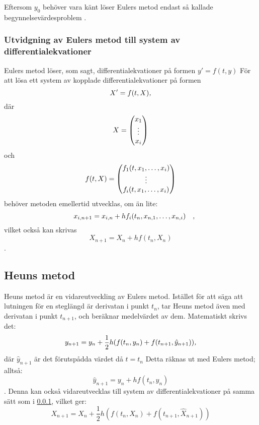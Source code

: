 Eftersom \(y_0\) behöver vara känt löser Eulers metod endast så kallade begynnelsevärdes\-problem \parencite[310]{suli_introduction_2003}.

\subsubsection{Utvidgning av Eulers metod till system av differentialekvationer}\label{sec:euler_dev}
Eulers metod löser, som sagt, differentialekvationer på formen \(y'=f(t, y)\) För att lösa ett system av kopplade differentialekvationer på formen
\begin{equation}
    X'=f(t, X)
\emph{,}\end{equation} där
\begin{equation*}
    X=\begin{pmatrix}x_1\\\vdots\\x_i\end{pmatrix}
\end{equation*} och 
\begin{equation*}
    f(t, X)=\begin{pmatrix}
        f_1(t, x_1,\hdots,x_i)\\
        \vdots\\
        f_i(t, x_1,\hdots,x_i)
    \end{pmatrix}
\end{equation*}
behöver metoden emellertid utvecklas, om än lite:
\begin{equation}
    x_{i, n+1}=x_{i, n}+hf_i(t_n, x_{n, 1},\hdots,x_{n, i})
\quad\mathrm{,}\!\!\!\!\!\!\end{equation} vilket också kan skrivas 
\begin{equation}
    X_{n+1}=X_{n}+hf(t_n, X_n)
\end{equation} \parencites[340; 355-356]{atkinson_introduction_1989}.

\subsection{Heuns metod}
Heuns metod är en vidareutveckling av Eulers metod. Istället för att säga att lutningen för en steglängd är derivatan i punkt \(t_n\), tar Heuns metod även med derivatan i punkt \(t_{n+1}\), och beräknar medelvärdet av dem. Matematiskt skrivs det:
\begin{equation}
    y_{n+1}=y_n+\frac{1}{2}h(f(t_n, y_n)+f(t_{n+1}, \hat{y}_{n+1}))
\emph{,}\end{equation} där \(\hat{y}_{n+1}\) är det förutspådda värdet då \(t=t_{n}\) Detta räknas ut med Eulers metod; alltså:
\begin{equation}
     \hat{y}_{n+1}=y_{n}+hf(t_n, y_n)
\end{equation} \parencite[324]{suli_introduction_2003}. Denna kan också vidareutvecklas till system av differentialekvationer på samma sätt som i \ref{sec:euler_dev}, vilket ger:
\begin{equation}
    X_{n+1}=X_n+\frac{1}{2}h(f(t_n, X_n)+f(t_{n+1}, \hat{X}_{n+1}))
\end{equation}

